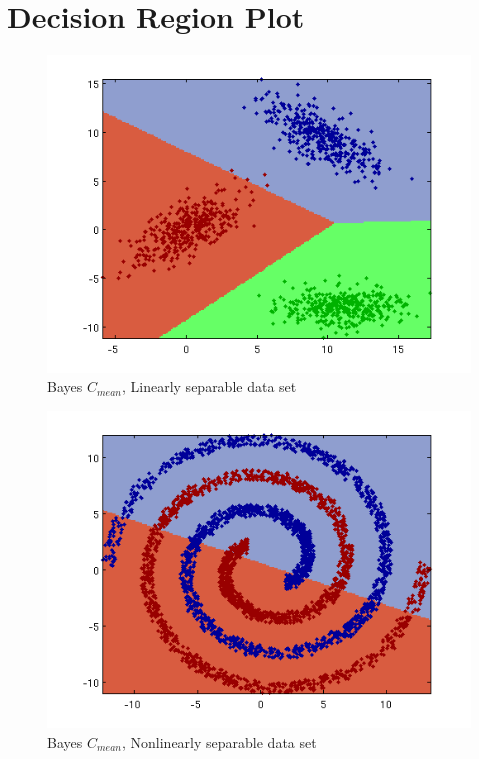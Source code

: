 \documentclass[a4paper]{article}
\begin{document}
\section{Decision Region Plot}
\begin{figure}[h]
\includegraphics[clip, trim=40px 15px 30px 10px]{data1a_1a.png}
\caption{Bayes $C_{mean}$, Linearly separable data set}
\end{figure}

\begin{figure}[h]
\includegraphics[clip, trim=40px 15px 30px 10px]{data1b_1a.png}
\caption{Bayes $C_{mean}$, Nonlinearly separable data set}
\end{figure}
\end{document}
